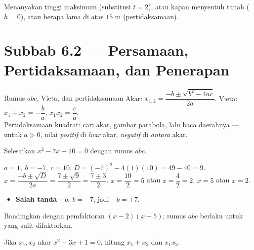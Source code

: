 \begin{variasi}
Menanyakan tinggi maksimum (substitusi $t=2$), atau kapan menyentuh tanah
($h=0$), atau berapa lama di atas $15$ m (pertidaksamaan).
\end{variasi}

\section*{Subbab 6.2 — Persamaan, Pertidaksamaan, dan Penerapan}

\begin{ingat}{Rumus $abc$, Vieta, dan pertidaksamaan}
Akar: $x_{1,2}=\dfrac{-b\pm\sqrt{b^2-4ac}}{2a}$. Vieta:
$x_1+x_2=-\dfrac ba$, $x_1x_2=\dfrac ca$. \\
Pertidaksamaan kuadrat: cari akar, gambar parabola, lalu baca daerahnya --- untuk
$a>0$, nilai \emph{positif} di \emph{luar} akar, \emph{negatif} di \emph{antara}
akar.
\end{ingat}

\begin{soalbox}{}
Selesaikan $x^2-7x+10=0$ dengan rumus $abc$.
\end{soalbox}

\jawab
{} $a=1,\ b=-7,\ c=10$. $D=(-7)^2-4(1)(10)=49-40=9$.
 $x=\dfrac{-b\pm\sqrt D}{2a}=\dfrac{7\pm\sqrt9}{2}=\dfrac{7\pm3}{2}$.
 $x=\dfrac{10}{2}=5$ atau $x=\dfrac{4}{2}=2$.
\jadi $x=5$ atau $x=2$.

\begin{jebakan}
\begin{itemize}[leftmargin=*,topsep=2pt]
  \item \textbf{Salah tanda $-b$.} $b=-7$, jadi $-b=+7$.
\end{itemize}
\end{jebakan}

\begin{variasi}
Bandingkan dengan pemfaktoran $(x-2)(x-5)$; rumus $abc$ berlaku untuk yang sulit
difaktorkan.
\end{variasi}

\begin{soalbox}{}
Jika $x_1,x_2$ akar $x^2-3x+1=0$, hitung $x_1+x_2$ dan $x_1x_2$.
\end{soalbox}

